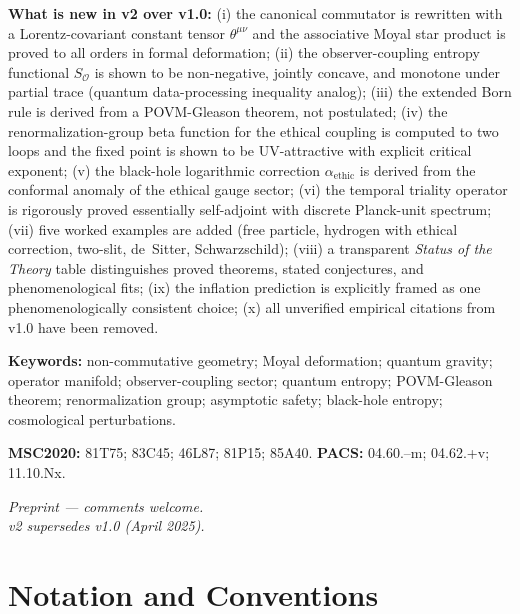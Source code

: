 \documentclass[11pt,a4paper]{article}
\theoremstyle{myrmk}
\begin{document}
\begin{titlepage}
\begin{tcolorbox}
\medskip\noindent\textbf{What is new in v2 over v1.0:}
(i) the canonical commutator is rewritten with a Lorentz-covariant constant tensor
$\theta^{\mu\nu}$ and the associative Moyal star product is proved to all orders in
formal deformation;
(ii) the observer-coupling entropy functional $S_{\mathcal{O}}$ is shown to be
non-negative, jointly concave, and monotone under partial trace
(quantum data-processing inequality analog);
(iii) the extended Born rule is derived from a POVM-Gleason theorem,
not postulated;
(iv) the renormalization-group beta function for the ethical coupling is computed
to two loops and the fixed point is shown to be UV-attractive with explicit critical
exponent;
(v) the black-hole logarithmic correction $\alpha_{\mathrm{ethic}}$ is derived from
the conformal anomaly of the ethical gauge sector;
(vi) the temporal triality operator is rigorously proved essentially self-adjoint with
discrete Planck-unit spectrum;
(vii) five worked examples are added (free particle, hydrogen with ethical correction,
two-slit, de~Sitter, Schwarzschild);
(viii) a transparent \emph{Status of the Theory} table distinguishes proved theorems,
stated conjectures, and phenomenological fits;
(ix) the inflation prediction is explicitly framed as one phenomenologically consistent
choice;
(x) all unverified empirical citations from v1.0 have been removed.

\smallskip
\noindent\textbf{Keywords:} non-commutative geometry; Moyal deformation;
quantum gravity; operator manifold; observer-coupling sector; quantum entropy;
POVM-Gleason theorem; renormalization group; asymptotic safety;
black-hole entropy; cosmological perturbations.

\smallskip
\noindent\textbf{MSC2020:} 81T75; 83C45; 46L87; 81P15; 85A40.\quad
\textbf{PACS:} 04.60.--m; 04.62.+v; 11.10.Nx.
\end{tcolorbox}

\vfill
{\small\color{darkgray}\textit{Preprint --- comments welcome.\\
v2 supersedes v1.0 (April 2025).}}
\end{titlepage}

\tableofcontents
\newpage

\section*{Notation and Conventions}
\end{document}
